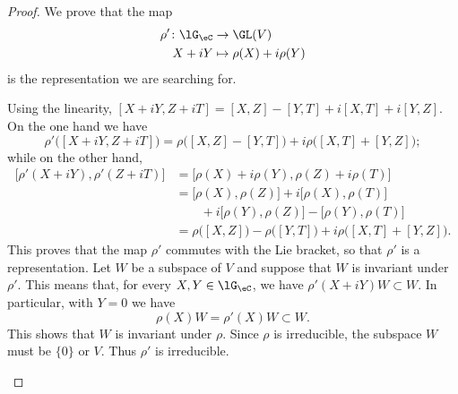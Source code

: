 \begin{proof}
	We prove that the map
	\begin{equation}
		\begin{aligned}
			\rho'\colon \lG_{\eC} & \to \GL(V)               \\
			X+iY                  & \mapsto \rho(X)+i\rho(Y)
		\end{aligned}
	\end{equation}
	is the representation we are searching for.

	\begin{subproof}
		Using the linearity, \( [X+iY,Z+iT]=[X,Z]-[Y,T]+i[X,T]+i[Y,Z]\). On the one hand we have
		\begin{equation}
			\rho'\big( [X+iY,Z+iT] \big)=\rho\big( [X,Z]-[Y,T] \big)+i\rho\big( [X,T]+[Y,Z] \big);
		\end{equation}
		while on the other hand,
		\begin{subequations}
			\begin{align}
				\big[ \rho'(X+iY),\rho'(Z+iT) \big] & =\big[ \rho(X)+i\rho(Y),\rho(Z)+i\rho(T) \big]                             \\
				                                    & =\big[ \rho(X),\rho(Z) \big]+i\big[ \rho(X),\rho(T) \big]                  \\
				                                    & \qquad+i\big[ \rho(Y),\rho(Z) \big]-\big[ \rho(Y),\rho(T) \big]            \\
				                                    & =\rho\big( [X,Z] \big)-\rho\big( [Y,T] \big)+i\rho\big( [X,T]+[Y,Z] \big).
			\end{align}
		\end{subequations}
		This proves that the map \( \rho'\) commutes with the Lie bracket, so that \( \rho'\) is a representation.
		\spitem[Irreducible]
		Let \( W\) be a subspace of \( V\) and suppose that \( W\) is invariant under \( \rho'\). This means that, for every \( X,Y\in \lG_{\eC}\), we have \( \rho'(X+iY)W\subset W\). In particular, with \( Y=0\) we have
		\begin{equation}
			\rho(X)W=\rho'(X)W\subset W.
		\end{equation}
		This shows that \( W\) is invariant under \( \rho\). Since \( \rho\) is irreducible, the subspace \( W\) must be \( \{ 0 \}\) or \( V\). Thus \( \rho'\) is irreducible.
	\end{subproof}
\end{proof}

